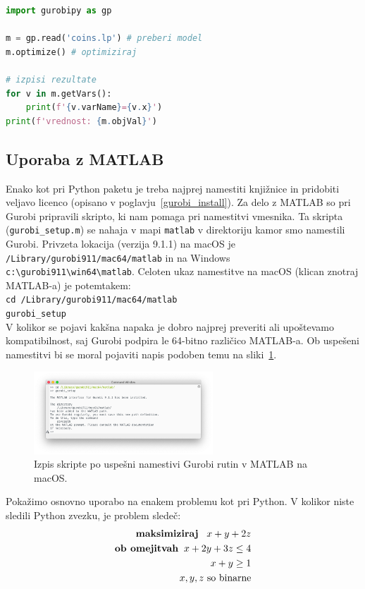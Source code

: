 \documentclass[a4paper,11pt]{article}
\begin{document}
\begin{lstlisting}[language=Python,caption=Primer uporabe LP formatov in gurobipy,label=code:gurobipy]
import gurobipy as gp

m = gp.read('coins.lp') # preberi model
m.optimize() # optimiziraj

# izpisi rezultate
for v in m.getVars(): 
    print(f'{v.varName}={v.x}')
print(f'vrednost: {m.objVal}')
\end{lstlisting}

\subsection{Uporaba z MATLAB}

Enako kot pri Python paketu je treba najprej namestiti knjižnice in pridobiti veljavo licenco (opisano v poglavju~\ref{gurobi_install}). Za delo z MATLAB so pri Gurobi pripravili skripto, ki nam pomaga pri namestitvi vmesnika. Ta skripta (\texttt{gurobi\_setup.m}) se nahaja v mapi \texttt{matlab} v direktoriju kamor smo namestili Gurobi. Privzeta lokacija (verzija 9.1.1) na macOS je \texttt{/Library/gurobi911/\-mac64/matlab} in na Windows \texttt{c:\textbackslash gurobi911\textbackslash win64\textbackslash matlab}. Celoten ukaz namestitve na macOS (klican znotraj MATLAB-a) je potemtakem: \\
\texttt{cd /Library/gurobi911/mac64/matlab} \\
\texttt{gurobi\_setup} \\
 V kolikor se pojavi kakšna napaka je dobro najprej preveriti ali upoštevamo kompatibilnost, saj Gurobi podpira le 64-bitno različico MATLAB-a. Ob uspešeni namestitvi bi se moral pojaviti napis podoben temu na sliki~\ref{img:gurobi_matlab_install}.
\begin{figure}[hbpt]
	\centering
	\includegraphics[width=0.6\textwidth]{images/gurobi_matlab_install.png}
	\caption{Izpis skripte po uspešni namestivi Gurobi rutin v MATLAB na macOS.}
	\label{img:gurobi_matlab_install}
\end{figure}

Pokažimo osnovno uporabo na enakem problemu kot pri Python. V kolikor niste sledili Python zvezku, je problem sledeč:
\begin{equation}
\begin{aligned}
\textbf{maksimiziraj} \hspace{3mm} x + y + 2z  \\
\textbf{ob omejitvah} \hspace{2mm} x + 2y + 3z \leq 4\\
x + y \geq 1 \\
x, y, z \text{ so binarne}
\end{aligned}
\end{equation}
\end{document}
